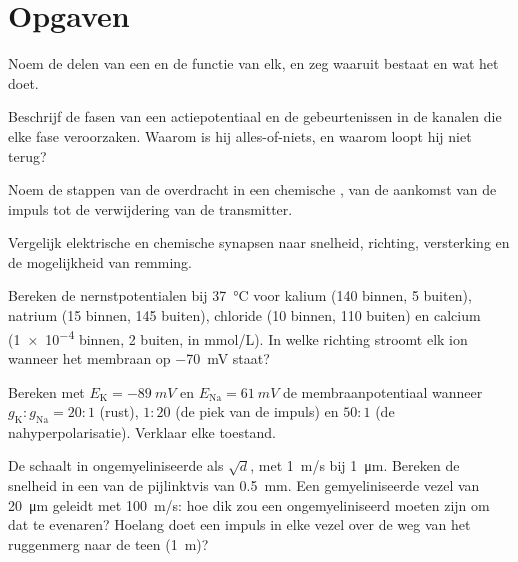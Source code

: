 \section{Opgaven}

\begin{exercise}[$\star$]\label{exo:b2:neurons-synapses:1}
Noem de delen van een  en de functie van elk, en zeg waaruit 
bestaat en wat het doet.
\end{exercise}

\begin{exercise}[$\star$]\label{exo:b2:neurons-synapses:2}
Beschrijf de fasen van een actiepotentiaal en de gebeurtenissen in de kanalen
die elke fase veroorzaken. Waarom is hij alles-of-niets, en waarom loopt hij
niet terug?
\end{exercise}

\begin{exercise}[$\star$]\label{exo:b2:neurons-synapses:3}
Noem de stappen van de overdracht in een chemische , van de aankomst
van de impuls tot de verwijdering van de transmitter.
\end{exercise}

\begin{exercise}[$\star$]\label{exo:b2:neurons-synapses:4}
Vergelijk elektrische en chemische synapsen naar snelheid, richting,
versterking en de mogelijkheid van remming.
\end{exercise}

\begin{exercise}[$\star\star$]\label{exo:b2:neurons-synapses:5}
Bereken de nernstpotentialen bij \qty{37}{\celsius} voor kalium
(140 binnen, 5 buiten), natrium (15 binnen, 145 buiten), chloride (10 binnen,
110 buiten) en calcium (\qty{1e-4}{} binnen, 2 buiten, in \unit{mmol/L}). In
welke richting stroomt elk ion wanneer het membraan op \qty{-70}{mV} staat?
\end{exercise}

\begin{exercise}[$\star\star$]\label{exo:b2:neurons-synapses:6}
Bereken met $E_{\mathrm K} = \qty{-89}{mV}$ en $E_{\mathrm{Na}} =
\qty{+61}{mV}$ de membraanpotentiaal wanneer $g_{\mathrm K} :
g_{\mathrm{Na}} = 20 : 1$ (rust), $1 : 20$ (de piek van de impuls)
en $50 : 1$ (de nahyperpolarisatie). Verklaar elke toestand.
\end{exercise}

\begin{exercise}[$\star\star$]\label{exo:b2:neurons-synapses:7}
De  schaalt in ongemyeliniseerde  als $\sqrt d$, met
\qty{1}{m/s} bij \qty{1}{\micro m}. Bereken de snelheid in een  van de
pijlinktvis van \qty{0.5}{mm}. Een gemyeliniseerde vezel van
\qty{20}{\micro m} geleidt met \qty{100}{m/s}: hoe dik zou een
ongemyeliniseerd  moeten zijn om dat te evenaren? Hoelang doet een impuls
in elke vezel over de weg van het ruggenmerg naar de teen (\qty{1}{m})?
\end{exercise}


